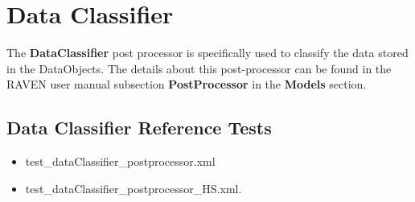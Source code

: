 \section{Data Classifier}
\label{sec:dataClassifier}

The \textbf{DataClassifier} post processor is specifically used to classify the data stored in the DataObjects.
The details about this post-processor can be found in the RAVEN user manual subsection \textbf{PostProcessor}
in the \textbf{Models} section.

\subsection{Data Classifier Reference Tests}
\begin{itemize}
	\item test\_dataClassifier\_postprocessor.xml
  \item test\_dataClassifier\_postprocessor\_HS.xml.
\end{itemize}
